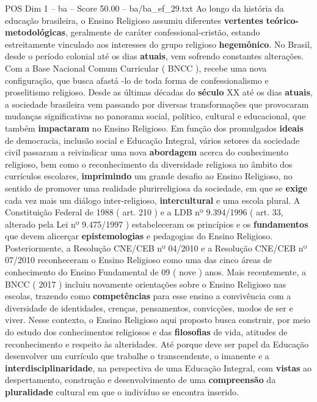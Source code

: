 \begin{textsample}{POS Dim 1 – ba – Score 50.00 – ba/ba\_ef\_29.txt}  \label{ex:f1_pos_109}
Ao longo da história da educação brasileira, o Ensino Religioso assumiu diferentes \textbf{vertentes} \textbf{teórico-metodológicas}, geralmente de caráter confessional-cristão, estando estreitamente vinculado aos interesses do grupo religioso \textbf{hegemônico}.
No Brasil, desde o período colonial até os dias \textbf{atuais}, vem sofrendo constantes alterações.
Com a Base Nacional Comum Curricular ( BNCC ), recebe uma nova configuração, que busca afastá -lo de toda forma de confessionalismo e proselitismo religioso.
Desde as últimas décadas do \textbf{século} XX até os dias \textbf{atuais}, a sociedade brasileira vem passando por diversas transformações que provocaram mudanças significativas no panorama social, político, cultural e educacional, que também \textbf{impactaram} no Ensino Religioso.
Em função dos promulgados \textbf{ideais} de democracia, inclusão social e Educação Integral, vários setores da sociedade civil passaram a reivindicar uma nova \textbf{abordagem} acerca do conhecimento religioso, bem como o reconhecimento da diversidade religiosa no âmbito dos currículos escolares, \textbf{imprimindo} um grande desafio ao Ensino Religioso, no sentido de promover uma realidade plurirreligiosa da sociedade, em que se \textbf{exige} cada vez mais um diálogo inter-religioso, \textbf{intercultural} e uma escola plural.
A Constituição Federal de 1988 ( art. 210 ) e a LDB nº 9.394/1996 ( art. 33, alterado pela Lei nº 9.475/1997 ) estabeleceram os princípios e os \textbf{fundamentos} que devem alicerçar \textbf{epistemologias} e pedagogias do Ensino Religioso.
Posteriormente, a Resolução CNE/CEB nº 04/2010 e a Resolução CNE/CEB nº 07/2010 reconheceram o Ensino Religioso como uma das cinco áreas de conhecimento do Ensino Fundamental de 09 ( nove ) anos.
Mais recentemente, a BNCC ( 2017 ) incluiu novamente orientações sobre o Ensino Religioso nas escolas, trazendo como \textbf{competências} para esse ensino a convivência com a diversidade de identidades, crenças, pensamentos, convicções, modos de ser e viver.
Nesse contexto, o Ensino Religioso aqui proposto busca construir, por meio do estudo dos conhecimentos religiosos e das \textbf{filosofias} de vida, atitudes de reconhecimento e respeito às alteridades.
Até porque deve ser papel da Educação desenvolver um currículo que trabalhe o transcendente, o imanente e a \textbf{interdisciplinaridade}, na perspectiva de uma Educação Integral, com \textbf{vistas} ao despertamento, construção e desenvolvimento de uma \textbf{compreensão} da \textbf{pluralidade} cultural em que o indivíduo se encontra inserido.

\end{textsample}
